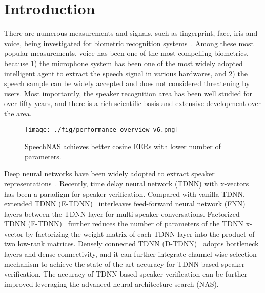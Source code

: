 \documentclass{article}
\begin{document}
\section{Introduction}
\label{sec:intro}
There are numerous measurements and signals, such as fingerprint, face, iris and voice, being investigated for biometric recognition systems~\cite{bimbot2004tutorial}. Among these most popular measurements, voice has been one of the most compelling biometrics, because 1) the microphone system has been one of the most widely adopted intelligent agent to extract the speech signal in various hardwares, and 2) the speech sample can be widely accepted and does not considered threatening by users. Most importantly, the speaker recognition area has been well studied for over fifty years, and there is a rich scientific basis and extensive development over the area.
\begin{figure}[t]
\begin{minipage}[b]{1\linewidth}
  \centering
  \centerline{\texttt{[image: ./fig/performance\_overview\_v6.png]}}
\end{minipage}
\caption{SpeechNAS achieves better cosine EERs with lower number of parameters.}
\label{fig:performance_overview}
\end{figure}

Deep neural networks have been widely adopted to extract speaker representations~\cite{snyder2018x}. Recently, time delay neural network (TDNN) with x-vectors~\cite{snyder2018x} has been a paradigm for speaker verification. Compared with vanilla TDNN, extended TDNN (E-TDNN)~\cite{snyder2019speaker} interleaves feed-forward neural network (FNN) layers between the TDNN layer for multi-speaker conversations. Factorized TDNN (F-TDNN)~\cite{villalba2019state} further reduces the number of parameters of the TDNN x-vector by factorizing the weight matrix of each TDNN layer into the product of two low-rank matrices. Densely connected TDNN (D-TDNN)~\cite{yu2020densely} adopts bottleneck layers and dense connectivity, and it can further integrate channel-wise selection mechanism to achieve the state-of-the-art accuracy for TDNN-based speaker verification. The accuracy of TDNN based speaker verification can be further improved leveraging the advanced neural architecture search (NAS).  
\end{document}
